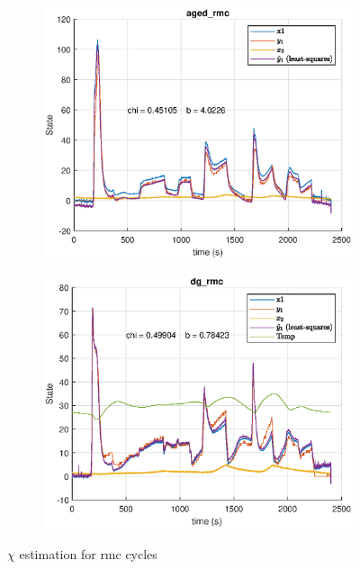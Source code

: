 \begin{figure}[H]
    \begin{minipage}{0.49\textwidth}
        \begin{figure}[H]
            \includegraphics[width=\textwidth]{./figs/chi_est/aged_rmc_chi.eps}
        \end{figure}
    \end{minipage}
    \begin{minipage}{0.49\textwidth}
        \begin{figure}[H]
            \includegraphics[width=\textwidth]{./figs/chi_est/dg_rmc_chi.eps}
        \end{figure}
    \end{minipage}
        \caption{$\chi$ estimation for rmc cycles}
\end{figure}

